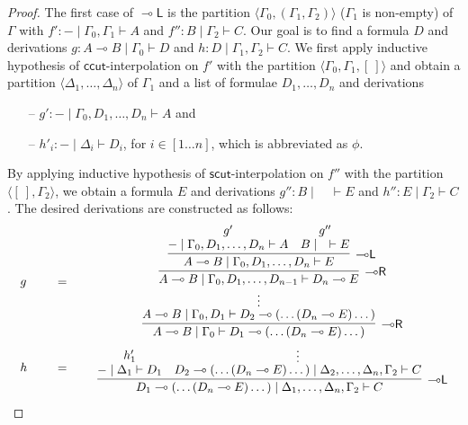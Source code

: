\documentclass[sn-mathphys-num]{sn-jnl}%
\newcommand{\GG}{\Gamma}
\newcommand{\GD}{\Delta}
\newcommand{\vd}{\vdash}
\newcommand{\lolli}{\multimap}
\newcommand{\lleft}{{\lolli}\mathsf{L}}
\newcommand{\lright}{{\lolli}\mathsf{R}}
\newcommand{\mf}[1]{\mathsf{#1}}
\theoremstyle{thmstyleone}%
\theoremstyle{thmstyletwo}%
\theoremstyle{thmstylethree}%
\begin{document}
\begin{proof}
The first case of $\lleft$ is the partition $\langle \GG_0, (\GG_1, \GG_2) \rangle$ ($\GG_1$ is non-empty) of $\GG$ with $f' : {-} \mid \GG_0, \GG_1 \vd A$ and $f'': B \mid \GG_2 \vd C$.
Our goal is to find a formula $D$ and derivations $g : A\lolli B \mid \GG_0 \vd D$ and $h: D \mid \GG_1, \GG_2 \vd C$.
We first apply inductive hypothesis of $\mf{ccut}$-interpolation on $f'$ with the partition $\langle \GG_0 , \GG_1 , [\ ]\rangle$ and obtain a partition $\langle \GD_1, \dots , \GD_n \rangle$ of $\GG_1$ and a list of formulae $D_1 , \dots , D_n$ and derivations
\begin{itemize}
  \item[--] $g': {-} \mid \GG_0 , D_1, \dots, D_n \vd A$ and
  \item[--] $h'_i : {-} \mid \GD_i \vd D_i$, for $i \in [1\dots n]$, which is abbreviated as $\phi$.
\end{itemize}
By applying inductive hypothesis of $\mf{scut}$-interpolation on $f''$ with the partition $\langle [\ ] , \GG_2 \rangle$, we obtain a formula $E$ and derivations $g'' : B \mid \quad \vd E$ and $h'': E \mid \GG_2 \vd C$.
The desired derivations are constructed as follows:
\begin{displaymath}
\begin{array}{lcc}
  \begin{array}{c}
    g
  \end{array}
  \quad 
  &=&
  \quad
    \begin{array}{c}
      \infer[\lright]{A\lolli B \mid \GG_0 \vd D_1 \lolli (\dots (D_n \lolli E)\dots)}{
      \deduce{A \lolli B \mid \GG_0 , D_1 \vd D_2 \lolli (\dots (D_n \lolli E)\dots)}{\deduce{\vdots}{
        \infer[\lright]{A \lolli B \mid \GG_0 , D_1, \dots ,D_{n-1} \vd D_n \lolli E}{
        \infer[\lleft]{A \lolli B \mid \GG_0 , D_1, \dots, D_n \vd E}{
          \deduce{{-} \mid \GG_0 , D_1, \dots, D_n \vd A}{g'}
          &
          \deduce{B \mid \quad \vd E}{g''}
        }
      }
      }
      }
    }
    \end{array}
    \\[1.5cm]
    \begin{array}{c}
      h
    \end{array}
    \quad
    &=&
    \quad
    \begin{array}{c}
      \infer[\lleft]{D_1 \lolli (\dots (D_n \lolli E)\dots) \mid \GD_1, \dots, \GD_n, \GG_2 \vd C}{
      \deduce{{-} \mid \GD_1 \vd D_1}{h'_1}
      &
      \deduce{D_2 \lolli (\dots (D_n \lolli E)\dots) \mid \GD_2, \dots, \GD_n, \GG_2 \vd C}{
        \deduce{\vdots}{
}}}
\end{array}
\end{array}
\end{displaymath}
\end{proof}
\end{document}
